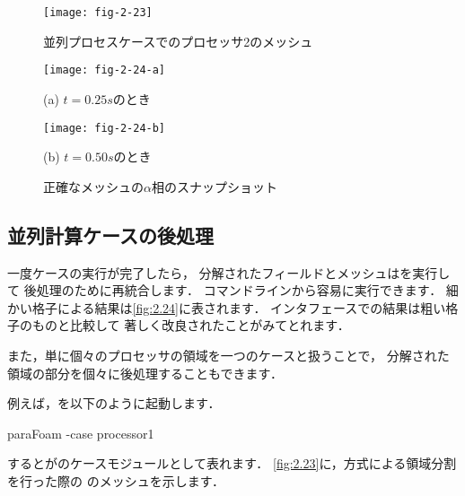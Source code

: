 \begin{figure}[ht]
 \texttt{[image: fig-2-23]}
 \caption{並列プロセスケースでのプロセッサ2のメッシュ}
 \label{fig:2.23}
\end{figure}


\begin{figure}[ht]
 \texttt{[image: fig-2-24-a]}\par
 (a) $t = 0.25\unit{s}$のとき\par
 \medskip
 \texttt{[image: fig-2-24-b]}\par
 (b) $t = 0.50\unit{s}$のとき
 \caption{正確なメッシュの$\alpha$相のスナップショット}
 \label{fig:2.24}
\end{figure}


\subsection{並列計算ケースの後処理}
\label{sssec:2.3.11}
一度ケースの実行が完了したら，
分解されたフィールドとメッシュはを実行して
後処理のために再統合します．
コマンドラインから容易に実行できます．
細かい格子による結果は\autoref{fig:2.24}に表されます．
インタフェースでの結果は粗い格子のものと比較して
著しく改良されたことがみてとれます．

また，単に個々のプロセッサの領域を一つのケースと扱うことで，
分解された領域の部分を個々に後処理することもできます．

例えば，を以下のように起動します．
\begin{OFverbatim}[terminal]
paraFoam -case processor1
\end{OFverbatim}
するとがのケースモジュールとして表れます．
\autoref{fig:2.23}に，方式による領域分割を行った際の
のメッシュを示します．
